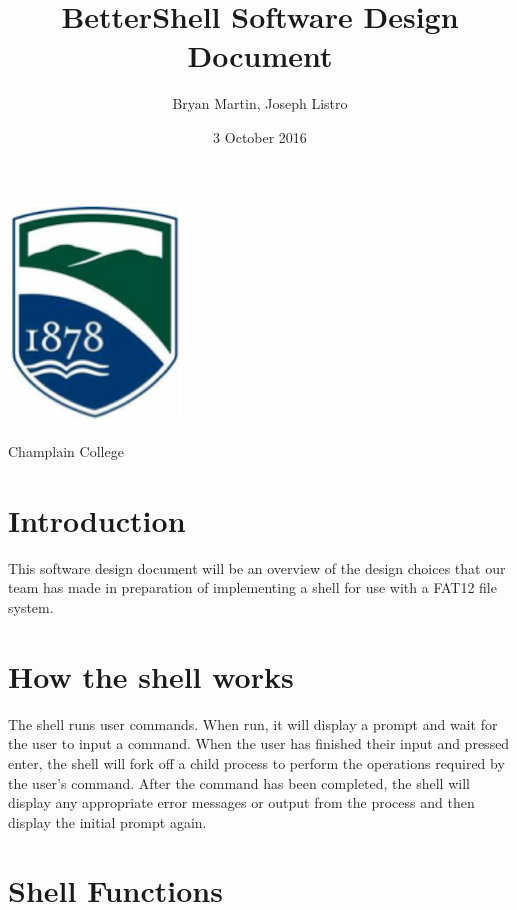 \documentclass[12pt,letterpaper]{article}
\begin{document}
\title{BetterShell Software Design Document}
\date{3 October 2016}
\author{Bryan Martin, Joseph Listro}

\maketitle
\vspace{-15mm}

\begin{center}
{\large

	\vspace{20mm}
	\includegraphics[scale=2]{champlain1}
	
	Champlain College
}
\end{center}

\newpage
\tableofcontents

\newpage
\section{Introduction}
This software design document will be an overview of the design choices that our team has made in preparation of implementing a shell for use with a FAT12 file system.

\section{How the shell works}

The shell runs user commands.  When run, it will display a prompt and wait for the user to input a command.  When the user has finished their input and pressed enter, the shell will fork off a child process to perform the operations required by the user's command. After the command has been completed, the shell will display any appropriate error messages or output from the process and then display the initial prompt again.

\section{Shell Functions}
\end{document}
